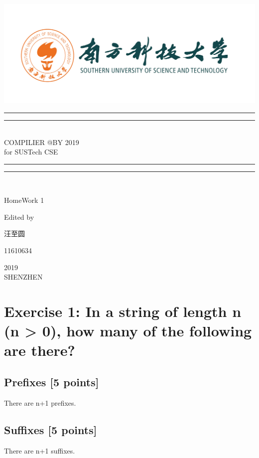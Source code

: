 \documentclass{article}
\begin{document}
 
    \begin{titlepage}       %
        \centering
        \includegraphics[width=\textwidth]{../SUSTC_LOGO.png}
        \rule{\textwidth}{1.6pt}\vspace*{-\baselineskip}\vspace*{2pt}
        \rule{\textwidth}{0.4pt}\\[\baselineskip]
        {\LARGE COMPILIER @BY 2019\\[\baselineskip]\small for SUSTech CSE}
        \\[0.2\baselineskip]
        \rule{\textwidth}{0.4pt}\vspace*{-\baselineskip}\vspace{3.2pt}
        \rule{\textwidth}{1.6pt}\\[\baselineskip]
        \scshape
        \vspace*{\baselineskip}
        {\Large HomeWork 1\par }
        Edited by \\[\baselineskip] {汪至圆\par}
        {\Large 11610634\par }
        \vfill
        {\scshape 2019} \\{\large SHENZHEN}\par
    \end{titlepage}

    \section{Exercise 1: In a string of length n (n > 0), how many of the following
    are there?}
        \subsection{Prefixes [5 points]}
        There are n+1 prefixes.
        \subsection{Suffixes [5 points]}
        There are n+1 suffixes.
\end{document}
